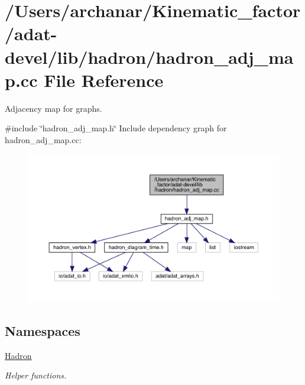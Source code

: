 \hypertarget{adat-devel_2lib_2hadron_2hadron__adj__map_8cc}{}\section{/\+Users/archanar/\+Kinematic\+\_\+factor/adat-\/devel/lib/hadron/hadron\+\_\+adj\+\_\+map.cc File Reference}
\label{adat-devel_2lib_2hadron_2hadron__adj__map_8cc}


Adjacency map for graphs.  


{\ttfamily \#include \char`\"{}hadron\+\_\+adj\+\_\+map.\+h\char`\"{}}\newline
Include dependency graph for hadron\+\_\+adj\+\_\+map.\+cc\+:
\nopagebreak
\begin{figure}[H]
\begin{center}
\leavevmode
\includegraphics[width=350pt]{d7/de9/adat-devel_2lib_2hadron_2hadron__adj__map_8cc__incl}
\end{center}
\end{figure}
\subsection*{Namespaces}
\begin{DoxyCompactItemize}
\item 
 \mbox{\hyperlink{namespaceHadron}{Hadron}}
\begin{DoxyCompactList}\small\item\em Helper functions. \end{DoxyCompactList}\end{DoxyCompactItemize}
